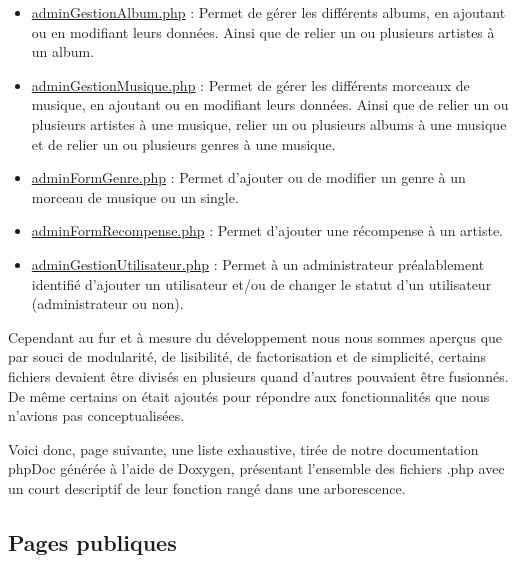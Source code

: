 \begin{paragraphe}
\begin{itemize}
        			\item \underline{adminGestionAlbum.php} : Permet de gérer les différents albums, en ajoutant ou en modifiant leurs données. Ainsi que de relier un ou plusieurs artistes à un album.
        			\item \underline{adminGestionMusique.php} : Permet de gérer les différents morceaux de musique, en ajoutant ou en modifiant leurs données. Ainsi que de relier un ou plusieurs artistes à une musique, relier un ou plusieurs albums à une musique et de relier un ou plusieurs genres à une musique.
        			\item \underline{adminFormGenre.php} : Permet d'ajouter ou de modifier un genre à un morceau de musique ou un single.
        			\item \underline{adminFormRecompense.php} : Permet d'ajouter une récompense à un artiste.
        			\item \underline{adminGestionUtilisateur.php} : Permet à un administrateur préalablement identifié d'ajouter un utilisateur et/ou de changer le statut d'un utilisateur (administrateur ou non).
        		\end{itemize}
        	\end{paragraphe}

        	\begin{paragraphe}
                Cependant au fur et à mesure du développement nous nous sommes aperçus que par souci de modularité, de lisibilité, de factorisation et de simplicité,
                certains fichiers devaient être divisés en plusieurs quand d'autres pouvaient être fusionnés.
                De même certains on était ajoutés pour répondre aux fonctionnalités que nous n'avions pas conceptualisées.
            \end{paragraphe}

            \begin{paragraphe}
                Voici donc, page suivante, une liste exhaustive, tirée de notre documentation phpDoc générée à l'aide de Doxygen, présentant l'ensemble des fichiers .php avec un court descriptif de leur
                fonction rangé dans une arborescence.
            \end{paragraphe}

\newpage


    \clearpage

    \subsection{Pages publiques}

